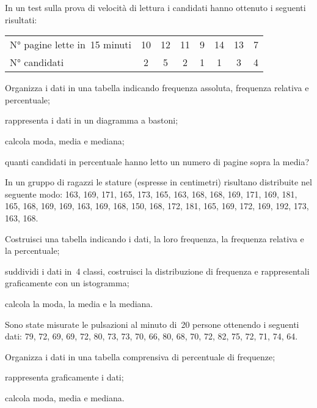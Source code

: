 \begin{esercizio}
\label{ese:A.40}
In un test sulla prova di velocità di lettura i candidati hanno ottenuto i seguenti risultati:
\begin{center}
 \begin{tabularx}{.7\textwidth}{X*{7}{c}}
\toprule
N° pagine lette in~15 minuti & 10 & 12 & 11 & 9 & 14 & 13 & 7 \\
N° candidati & 2 & 5 & 2 & 1 & 1 & 3 & 4 \\
\bottomrule
\end{tabularx}
\end{center}
\begin{enumeratea}
 \item Organizza i dati in una tabella indicando frequenza assoluta, frequenza relativa e percentuale;
 \item rappresenta i dati in un diagramma a bastoni;
 \item calcola moda, media e mediana;
 \item quanti candidati in percentuale hanno letto un numero di pagine sopra la media?
\end{enumeratea}
\end{esercizio}

\begin{esercizio}
\label{ese:A.41}
In un gruppo di ragazzi le stature (espresse in centimetri) risultano distribuite nel seguente modo:
163, 169, 171, 165, 173, 165, 163, 168,
168, 169, 171, 169, 181, 165, 168, 169,
169, 163, 169, 168, 150, 168, 172, 181,
165, 169, 172, 169, 192, 173, 163, 168.

\begin{enumeratea}
 \item Costruisci una tabella indicando i dati, la loro frequenza, la frequenza relativa e la percentuale;
 \item suddividi i dati in~4 classi, costruisci la distribuzione di frequenza e rappresentali graficamente con un istogramma;
 \item calcola la moda, la media e la mediana.
\end{enumeratea}
\end{esercizio}

\begin{esercizio}
\label{ese:A.42}
Sono state misurate le pulsazioni al minuto di~20 persone ottenendo i seguenti dati:
79, 72, 69, 69, 72, 80, 73, 73, 70, 66,
80, 68, 70, 72, 82, 75, 72, 71, 74, 64.

\begin{enumeratea}
 \item Organizza i dati in una tabella comprensiva di percentuale di frequenze;
 \item rappresenta graficamente i dati;
 \item calcola moda, media e mediana.
\end{enumeratea}
\end{esercizio}

